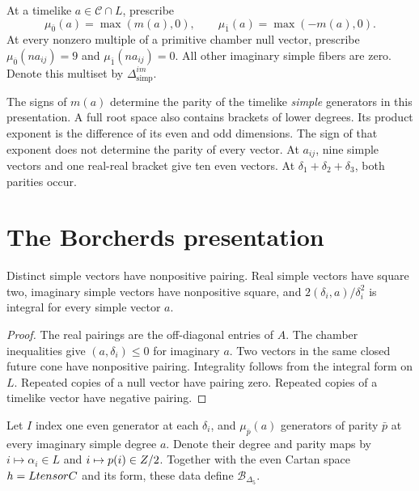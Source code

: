 \begin{definition}
\label{def:bkm-imaginary-simple-roots}
At a timelike $a\in\mathcal C\cap L$, prescribe
\[
 \mu_{\overline0}(a)=\max(m(a),0),\qquad
 \mu_{\overline1}(a)=\max(-m(a),0).
\]
At every nonzero multiple of a primitive chamber null vector,
prescribe $\mu_{\overline0}(na_{ij})=9$ and
$\mu_{\overline1}(na_{ij})=0$. All other imaginary simple fibers
are zero. Denote this multiset by $\Delta^{im}_{\mathrm{simp}}$.
\end{definition}

\begin{remark}
\label{rem:bkm-parity-split}
The signs of $m(a)$ determine the parity of the timelike
\emph{simple} generators in this presentation. A full root space also
contains brackets of lower degrees. Its product exponent is the difference of its even and odd dimensions.
The sign of that exponent does not determine the parity of every vector.
At $a_{ij}$, nine simple vectors and one real-real bracket give ten
even vectors. At $\delta_1+\delta_2+\delta_3$, both parities occur.
\end{remark}

\section{The Borcherds presentation}
\label{sec:bkm-generators-relations}
\label{sec:bkm-structural-properties}

\begin{lemma}
\label{lem:bkm-cartan-conditions}
Distinct simple vectors have nonpositive pairing. Real simple
vectors have square two, imaginary simple vectors have nonpositive
square, and $2(\delta_i,a)/\delta_i^2$ is integral for every simple
vector $a$.
\end{lemma}
\begin{proof}
The real pairings are the off-diagonal entries of $A$.
The chamber inequalities give $(a,\delta_i)\leq0$ for imaginary
$a$. Two vectors in the same closed future cone have nonpositive
pairing. Integrality follows from the integral form on $L$.
Repeated copies of a null vector have pairing zero. Repeated copies
of a timelike vector have negative pairing.
\end{proof}

\begin{definition}
\label{def:bkm-borcherds-cartan-superdatum}
Let $I$ index one even generator at each $\delta_i$, and
$\mu_{\bar p}(a)$ generators of parity $\bar p$ at every imaginary
simple degree $a$. Denote their degree and parity maps by
$i\mapsto\alpha_i\in L$ and $i\mapsto p(i)\in Z/2$.
Together with the even Cartan space $h=LtensorC$
and its form, these data define $\mathscr B_{\Delta_5}$.
\end{definition}

